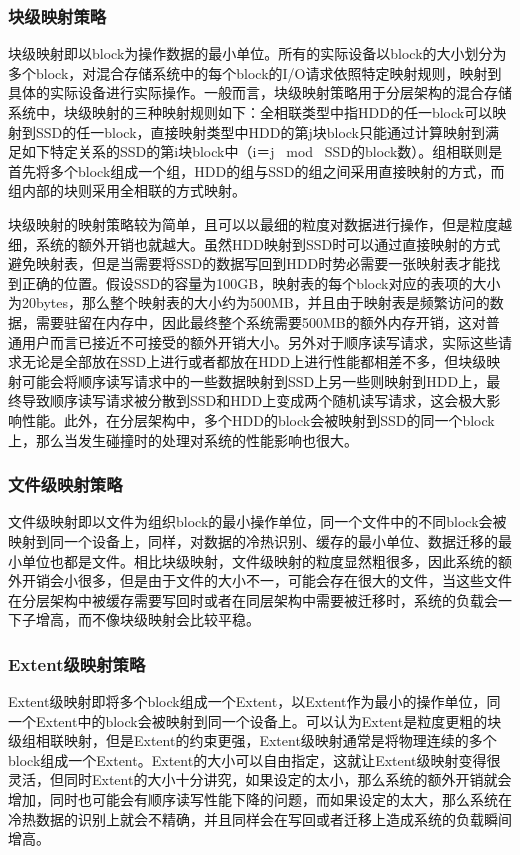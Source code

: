 \subsubsection{块级映射策略}

块级映射即以block为操作数据的最小单位。所有的实际设备以block的大小划分为多个block，对混合存储系统中的每个block的I/O请求依照特定映射规则，映射到具体的实际设备进行实际操作。一般而言，块级映射策略用于分层架构的混合存储系统中，块级映射的三种映射规则如下：全相联类型中指HDD的任一block可以映射到SSD的任一block，直接映射类型中HDD的第j块block只能通过计算映射到满足如下特定关系的SSD的第i块block中（i＝j \  mod \  SSD的block数）。组相联则是首先将多个block组成一个组，HDD的组与SSD的组之间采用直接映射的方式，而组内部的块则采用全相联的方式映射。

块级映射的映射策略较为简单，且可以以最细的粒度对数据进行操作，但是粒度越细，系统的额外开销也就越大。虽然HDD映射到SSD时可以通过直接映射的方式避免映射表，但是当需要将SSD的数据写回到HDD时势必需要一张映射表才能找到正确的位置。假设SSD的容量为100GB，映射表的每个block对应的表项的大小为20bytes，那么整个映射表的大小约为500MB，并且由于映射表是频繁访问的数据，需要驻留在内存中，因此最终整个系统需要500MB的额外内存开销，这对普通用户而言已接近不可接受的额外开销大小。另外对于顺序读写请求，实际这些请求无论是全部放在SSD上进行或者都放在HDD上进行性能都相差不多，但块级映射可能会将顺序读写请求中的一些数据映射到SSD上另一些则映射到HDD上，最终导致顺序读写请求被分散到SSD和HDD上变成两个随机读写请求，这会极大影响性能。此外，在分层架构中，多个HDD的block会被映射到SSD的同一个block上，那么当发生碰撞时的处理对系统的性能影响也很大。

\subsubsection{文件级映射策略}

文件级映射即以文件为组织block的最小操作单位，同一个文件中的不同block会被映射到同一个设备上，同样，对数据的冷热识别、缓存的最小单位、数据迁移的最小单位也都是文件。相比块级映射，文件级映射的粒度显然粗很多，因此系统的额外开销会小很多，但是由于文件的大小不一，可能会存在很大的文件，当这些文件在分层架构中被缓存需要写回时或者在同层架构中需要被迁移时，系统的负载会一下子增高，而不像块级映射会比较平稳。

\subsubsection{Extent级映射策略}

Extent级映射即将多个block组成一个Extent，以Extent作为最小的操作单位，同一个Extent中的block会被映射到同一个设备上。可以认为Extent是粒度更粗的块级组相联映射，但是Extent的约束更强，Extent级映射通常是将物理连续的多个block组成一个Extent。Extent的大小可以自由指定，这就让Extent级映射变得很灵活，但同时Extent的大小十分讲究，如果设定的太小，那么系统的额外开销就会增加，同时也可能会有顺序读写性能下降的问题，而如果设定的太大，那么系统在冷热数据的识别上就会不精确，并且同样会在写回或者迁移上造成系统的负载瞬间增高。

